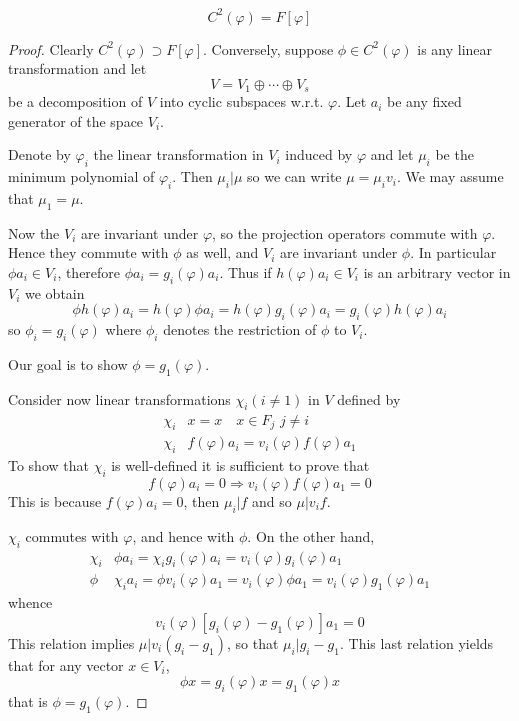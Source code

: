 \begin{theorem}[bicommutant]
\[C^2(\varphi)=F[\varphi]\]
\end{theorem}
\begin{proof}
Clearly $C^2(\varphi)\supset F[\varphi]$. Conversely, suppose $\phi\in C^2(\varphi)$ is any linear transformation and let \[ V=V_1\oplus \cdots\oplus V_s\] be a decomposition of $V$ into cyclic subspaces w.r.t. $\varphi$. Let $a_i$ be any fixed generator of the space $V_i$.\par
Denote by $\varphi_i$ the linear transformation in $V_i$ induced by $\varphi$ and let $\mu_i$ be the minimum polynomial of $\varphi_i$. Then $\mu_i|\mu$ so we can write $\mu=\mu_i v_i$. We may assume that $\mu_1=\mu$.\par
Now the $V_i$ are invariant under $\varphi$, so the projection operators commute with $\varphi$. Hence they commute with $\phi$ as well, and $V_i$ are invariant under $\phi$. In particular $\phi a_i\in V_i$, therefore $\phi a_i=g_i(\varphi)a_i$. Thus if $h(\varphi)a_i\in V_i$ is an arbitrary vector in $V_i$ we obtain \[\phi h(\varphi)a_i=h(\varphi)\phi a_i=h(\varphi)g_i(\varphi)a_i=g_i(\varphi)h(\varphi)a_i\]
so $\phi_i=g_i(\varphi)$ where $\phi_i$ denotes the restriction of $\phi$ to $V_i$.\par
Our goal is to show $\phi=g_1(\varphi)$.\par
Consider now linear transformations $\chi_i(i\ne 1)$ in $V$ defined by 
\begin{align*}
\chi_i &x=x\quad x\in F_j\,\, j\ne i\\
\chi_i &f(\varphi)a_i=v_i(\varphi)f(\varphi)a_1
\end{align*}
To show that $\chi_i$ is well-defined it is sufficient to prove that 
\[f(\varphi)a_i=0\Longrightarrow v_i(\varphi)f(\varphi)a_1=0\]
This is because $f(\varphi)a_i=0$, then $\mu_i|f$ and so $\mu |v_if$.\par
$\chi_i$ commutes with $\varphi$, and hence with $\phi$. On the other hand, 
\begin{align*}
\chi_i&\phi a_i=\chi_i g_i(\varphi)a_i=v_i(\varphi)g_i(\varphi)a_1\\
\phi&\chi_i a_i=\phi v_i(\varphi)a_1=v_i(\varphi)\phi a_1=v_i(\varphi)g_1(\varphi)a_1
\end{align*}
whence \[v_i(\varphi)[g_i(\varphi)-g_1(\varphi)]a_1=0\]
This relation implies $\mu|v_i(g_i-g_1)$, so that $\mu_i|g_i-g_1$. This last relation yields that for any vector $x\in V_i$, \[\phi x=g_i(\varphi)x=g_1(\varphi)x\]that is $\phi=g_1(\varphi)$.
\end{proof}

